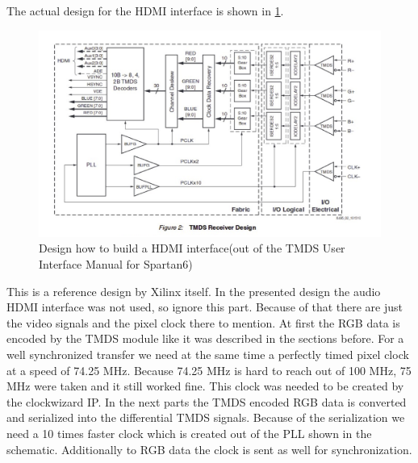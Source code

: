 The actual design for the HDMI interface is shown in \ref{hdmi_design}. 
\begin{figure}[h!]
	\centering
	\includegraphics[scale=0.7]{images/hdmi_design.png}

\caption{Design how to build a HDMI interface(out of the TMDS User Interface Manual for Spartan6)}
\label{hdmi_design}
\end{figure}
This is a reference design by Xilinx itself. In the presented design the audio HDMI interface was not used, so ignore this part. Because of that there are just the video signals and the pixel clock there to mention. At first the RGB data is encoded by the TMDS module like it was described in the sections before. For a well synchronized transfer we need at the same time a perfectly timed pixel clock at a speed of 74.25 MHz. Because 74.25 MHz is hard to reach out of 100 MHz, 75 MHz were taken and it still worked fine. This clock was needed to be created by the clockwizard IP. In the next parts the TMDS encoded RGB data is converted and serialized into the differential TMDS signals. Because of the serialization we need a 10 times faster clock which is created out of the PLL shown in the schematic. Additionally to RGB data the clock is sent as well for synchronization.

